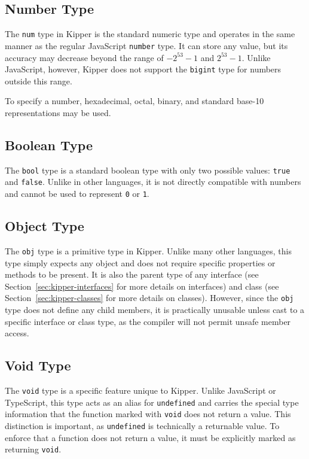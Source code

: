 \subsection{Number Type}

The \lstinline|num| type in Kipper is the standard numeric type and operates in the same manner as the regular JavaScript \lstinline|number| type. It can store any value, but its accuracy may decrease beyond the range of \(-2^{53} - 1\) and \(2^{53} - 1\). Unlike JavaScript, however, Kipper does not support the \lstinline|bigint| type for numbers outside this range.

To specify a number, hexadecimal, octal, binary, and standard base-10 representations may be used.

\subsection{Boolean Type}

The \lstinline|bool| type is a standard boolean type with only two possible values: \lstinline|true| and \lstinline|false|. Unlike in other languages, it is not directly compatible with numbers and cannot be used to represent \lstinline|0| or \lstinline|1|.

\subsection{Object Type}

The \lstinline|obj| type is a primitive type in Kipper. Unlike many other languages, this type simply expects any object and does not require specific properties or methods to be present. It is also the parent type of any interface (see Section~\ref{sec:kipper-interfaces} for more details on interfaces) and class (see Section~\ref{sec:kipper-classes} for more details on classes). However, since the \lstinline|obj| type does not define any child members, it is practically unusable unless cast to a specific interface or class type, as the compiler will not permit unsafe member access.

\subsection{Void Type}

The \lstinline|void| type is a specific feature unique to Kipper. Unlike JavaScript or TypeScript, this type acts as an alias for \lstinline|undefined| and carries the special type information that the function marked with \lstinline|void| does not return a value. This distinction is important, as \lstinline|undefined| is technically a returnable value. To enforce that a function does not return a value, it must be explicitly marked as returning \lstinline|void|.

